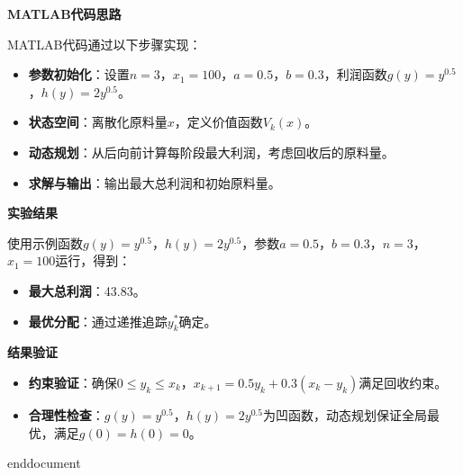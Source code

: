 \textbf{MATLAB代码思路}

MATLAB代码通过以下步骤实现：
\begin{itemize}
    \item \textbf{参数初始化}：设置$n=3$，$x_1=100$，$a=0.5$，$b=0.3$，利润函数$g(y) = y^{0.5}$，$h(y) = 2y^{0.5}$。
    \item \textbf{状态空间}：离散化原料量$x$，定义价值函数$V_k(x)$。
    \item \textbf{动态规划}：从后向前计算每阶段最大利润，考虑回收后的原料量。
    \item \textbf{求解与输出}：输出最大总利润和初始原料量。
\end{itemize}

\textbf{实验结果}

使用示例函数$g(y) = y^{0.5}$，$h(y) = 2y^{0.5}$，参数$a=0.5$，$b=0.3$，$n=3$，$x_1=100$运行，得到：
\begin{itemize}
    \item \textbf{最大总利润}：43.83。
    \item \textbf{最优分配}：通过递推追踪$y_k^*$确定。
\end{itemize}

\textbf{结果验证}

\begin{itemize}
    \item \textbf{约束验证}：确保$0 \leq y_k \leq x_k$，$x_{k+1} = 0.5 y_k + 0.3 (x_k - y_k)$满足回收约束。
    \item \textbf{合理性检查}：$g(y) = y^{0.5}$，$h(y) = 2y^{0.5}$为凹函数，动态规划保证全局最优，满足$g(0) = h(0) = 0$。
\end{itemize}

\ifx\allfiles\undefined
    
    
    
    end{document}
    \else
    \fi